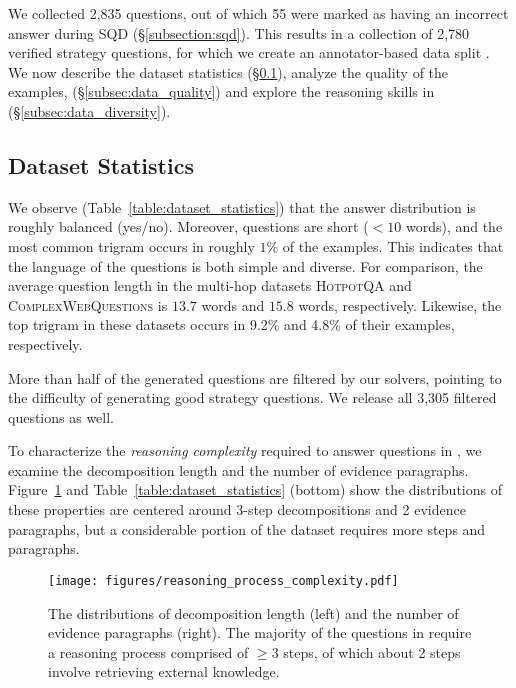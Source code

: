 {We collected 2,835 questions, out of which 55 were marked as having an incorrect answer during SQD (\S\ref{subsection:sqd}).
This results in a collection of 2,780 verified strategy questions, for which we create an annotator-based data split \cite{geva2019modeling}. 
We now describe the dataset statistics (\S\ref{subsec:dataset_statistics}), analyze the quality of the examples, (\S\ref{subsec:data_quality}) and explore the reasoning skills in \strategyqa{} (\S\ref{subsec:data_diversity}).

\subsection{Dataset Statistics}
\label{subsec:dataset_statistics}

We observe (Table~\ref{table:dataset_statistics}) that the answer distribution is roughly balanced (yes/no). Moreover, questions are short ($<10$ words), and the most common trigram occurs in roughly $1\%$ of the examples. This indicates that the language of the questions is both simple and diverse. For comparison, the average question length in the multi-hop datasets \textsc{HotpotQA} \cite{yang2018hotpotqa} and \textsc{ComplexWebQuestions} \cite{talmor2018web} is $13.7$ words and $15.8$ words, respectively. Likewise, the top trigram in these datasets occurs in 9.2\% and 4.8\% of their examples, respectively.

More than half of the generated questions are filtered by our solvers, pointing to the difficulty of generating good strategy questions. We release all 3,305 filtered questions as well.

To characterize the \emph{reasoning complexity} required to answer questions in \strategyqa{}, we examine the decomposition length and the number of evidence paragraphs. Figure~\ref{figure:reasoning_process_complexity} and Table~\ref{table:dataset_statistics} (bottom) show the distributions of these properties
are centered around 3-step decompositions and 2 evidence paragraphs, but a considerable
portion of the dataset requires more steps and paragraphs.

\begin{figure}[t]
    \centering
    \texttt{[image: figures/reasoning\_process\_complexity.pdf]}
    \vspace*{-2mm}
    \caption{
        The distributions of decomposition length (left) and the number of evidence paragraphs (right).
        The majority of the questions in \strategyqa{} require a reasoning process comprised of $\geq 3$ steps, of which about 2 steps involve retrieving external knowledge.
    }
    \label{figure:reasoning_process_complexity}
\end{figure}

}
